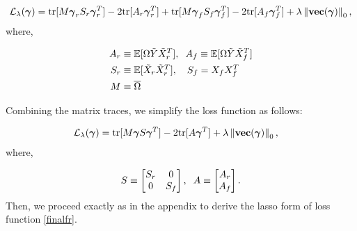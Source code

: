 \documentclass[ba]{imsart}
\newcommand\norm[1]{\left\lVert#1\right\rVert}
\begin{document}
\begin{equation}
	\begin{split}
		\mathcal{L}_{\lambda}(\boldsymbol{\gamma}) = \text{tr}[M\boldsymbol{\gamma}_{r}S_{r}\boldsymbol{\gamma}_{r}^{T}] - 2\text{tr}[A_{r}\boldsymbol{\gamma}_{r}^{T}] + \text{tr}[M\boldsymbol{\gamma}_{f}S_{f}\boldsymbol{\gamma}_{f}^{T}] - 2\text{tr}[A_{f}\boldsymbol{\gamma}_{f}^{T}] + \lambda \norm{\text{{\bf vec}}(\boldsymbol{\gamma})}_{0},	
	\end{split}
\end{equation}where,

\begin{equation}
	\begin{split}
		A_{r} &\equiv \mathbb{E}[\Omega\tilde{Y}\tilde{X}_{r}^{T}], \hspace{2mm} A_{f} \equiv \mathbb{E}[\Omega\tilde{Y}\tilde{X}_{f}^{T}]
		\\
		S_{r} &\equiv \mathbb{E}[\tilde{X}_{r}\tilde{X}_{r}^{T}], \hspace{3.5mm} S_{f} = X_{f}X_{f}^{T}
		\\
		M &\equiv \overline{\Omega}
	\end{split}
\end{equation} 

Combining the matrix traces, we simplify the loss function as follows:

\begin{equation}
	\begin{split}
		\mathcal{L}_{\lambda}(\boldsymbol{\gamma}) &= \text{tr}[ M \boldsymbol{\gamma} S \boldsymbol{\gamma}^{T} ] - 2\text{tr}[A\boldsymbol{\gamma}^{T}]  + \lambda \norm{\text{{\bf vec}}(\boldsymbol{\gamma})}_{0},
	\end{split}
\end{equation}where,

\begin{equation}
	\begin{split}
	 	S \equiv \begin{bmatrix}
	 		S_{r} & 0
	 		\\
	 		0 & S_{f}
	 		\end{bmatrix}, \hspace{2mm} 
	 	A \equiv \begin{bmatrix}
	 		A_{r} \\
	 		A_{f}
	 	\end{bmatrix}.
	\end{split} \label{finalfr}
\end{equation}Then, we proceed exactly as in the appendix to derive the lasso form of loss function \ref{finalfr}.
\end{document}
